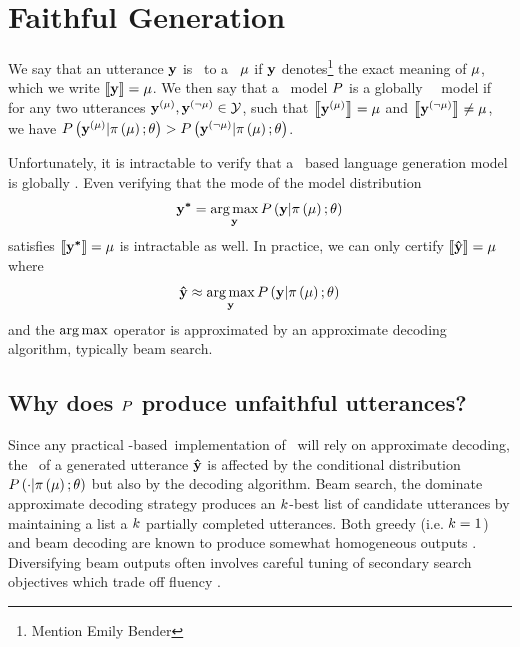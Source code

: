 \section{Faithful Generation}

We say that an utterance $\mathbf{y}$ is \faithful~to a 
\meaningrepresentation~$\mu$ if $\mathbf{y}$ denotes\footnote{Mention Emily Bender} the exact meaning 
of $\mu$, which we write $\left\llbracket \mathbf{y} \right\rrbracket = \mu$. We then say that a 
\surfacerealization~model $P$ is a globally \faithful~\surfacerealization~model
if for any two utterances $\mathbf{y}^{(\mu)},\mathbf{y}^{(\lnot \mu)} \in \mathcal{Y}$, such that 
$\left\llbracket \mathbf{y}^{(\mu)} \right\rrbracket = \mu$ and $\left\llbracket \mathbf{y}^{(\lnot \mu)} \right\rrbracket \ne \mu$, we have 
$P\left(\mathbf{y}^{(\mu)}|\pi\left(\mu\right);\theta\right) > P\left(\mathbf{y}^{(\lnot \mu)}|\pi\left(\mu\right);\theta\right)$.

Unfortunately, it is intractable to verify that a \sequencetosequence~based
language generation model is globally \faithful. Even verifying that the 
mode of the model distribution
\[\boldsymbol{\mathbf{y}^*} = \operatorname*{arg\,max}_{\mathbf{y}} P\left(\mathbf{y}|\pi\left(\mu\right);\theta  \right)\] satisfies $\left\llbracket \boldsymbol{\mathbf{y}^*} \right\rrbracket = \mu$ 
is intractable as well. In practice, we can only certify $\left\llbracket \boldsymbol{\hat{\mathbf{y}}} \right\rrbracket = \mu$ where
\[ \boldsymbol{\hat{\mathbf{y}}} \approx \operatorname*{arg\,max}_{\mathbf{y}} P\left(\mathbf{y}|\pi\left(\mu\right);\theta  \right)\] 
and the $\operatorname*{arg\,max}$ operator is approximated by an approximate decoding algorithm, typically beam search.

\subsection{Why does $P$ produce unfaithful utterances?}

Since any practical \sequencetosequence-based~implementation of 
\surfacerealization~will rely on approximate decoding, 
the \faithfulness~of a generated utterance $\boldsymbol{\hat{\mathbf{y}}}$ is affected
by the conditional distribution  $P\left(\cdot|\pi\left(\mu\right);\theta\right)$ but also by the decoding algorithm. Beam search, the dominate
approximate decoding strategy produces an $k$-best list of candidate
utterances by maintaining a list a $k$ partially completed utterances.
Both greedy (i.e. $k=1$) and beam decoding are known
to produce somewhat homogeneous outputs \citep{serban2016building}.
Diversifying
beam outputs often involves careful tuning of secondary search objectives
which trade off fluency \citep{li2015diversity}.

